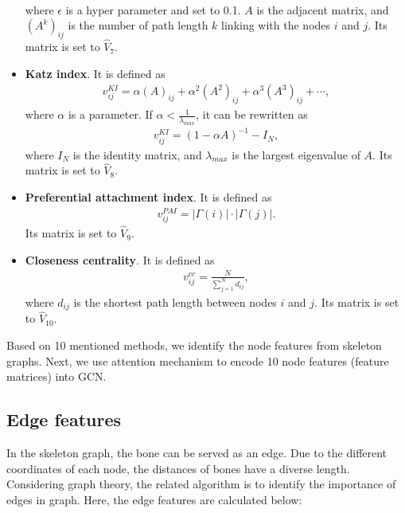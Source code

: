 \documentclass[journal]{IEEEtran}
\begin{document}
\begin{itemize}
\begin{align}
        \end{align}
        where $\epsilon$ is a hyper parameter and set to 0.1. $A$ is the adjacent matrix, and $(A^k)_{ij}$ is the number of path length $k$ linking with the nodes $i$ and $j$. Its matrix is set to $\hat{V}_7$.
        \item \textbf{Katz index}. It is defined as
        \begin{align}
            v_{ij}^{KI} = \alpha(A)_{ij}+\alpha^2(A^2)_{ij}+\alpha^3(A^3)_{ij}+\cdots,
        \label{eq8}
        \end{align}
        where $\alpha$ is a parameter. If $\alpha < \frac{1}{\lambda_{max}}$, it can be rewritten as
        \begin{align}
            v_{ij}^{KI} = (1-\alpha A)^{-1}-I_N,
        \label{eq9}
        \end{align}
        where $I_N$ is the identity matrix, and $\lambda_{max}$ is the largest eigenvalue of $A$. Its matrix is set to $\hat{V}_8$.
        \item \textbf{Preferential attachment index}. It is defined as
        \begin{align}
            v_{ij}^{PAI} = |\Gamma(i)| \cdot |\Gamma(j)|.
        \label{eq10}
        \end{align}
        Its matrix is set to $\hat{V}_9$.
        \item \textbf{Closeness centrality}. It is defined as
        \begin{align}
            v_{ij}^{cc} = \frac{N}{\sum_{j=1}^{N}d_{ij}},
        \label{eq11}
        \end{align}
        where $d_{ij}$ is the shortest path length between nodes $i$ and $j$. Its matrix is set to $\hat{V}_{10}$.

\end{itemize}

Based on 10 mentioned methods, we identify the node features from skeleton graphs. Next, we use attention mechanism to encode 10 node features (feature matrices) into GCN.

\subsection{Edge features}

In the skeleton graph, the bone can be served as an edge. Due to the different coordinates of each node, the distances of bones have a diverse length. Considering graph theory, the related algorithm is to identify the importance of edges in graph. Here, the edge features are calculated below:
\end{document}
